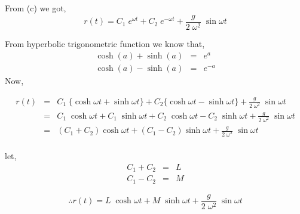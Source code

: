 \documentclass{article}
\begin{document}
\subsection{}%
\large{
    From (c) we got,
    $$r(t) = C_1\;e^{\omega t} + C_2\;e^{-\omega t} + \frac{g}{2\;\omega^2}\;\sin{\omega t}$$

    From hyperbolic trigonometric function we know that,
    \begin{eqnarray*}
        \cosh{(a)} + \sinh{(a)} &=& e^a\\
        \cosh{(a)} - \sinh{(a)} &=& e^{-a}
    \end{eqnarray*}
    Now,

    \begin{eqnarray*}
        r(t) &=& C_1\;\{\cosh{\omega t} + \sinh{\omega t}\} + C_2\{\cosh{\omega t} - \sinh{\omega t}\} + \frac{g}{2\;\omega^2}\;\sin{\omega t}\\
             &=& C_1\;\cosh{\omega t} + C_1\;\sinh{\omega t} + C_2\;\cosh{\omega t} - C_2\;\sinh{\omega t} + \frac{g}{2\;\omega^2}\;\sin{\omega t}\\
             &=& (C_1+C_2) \cosh{\omega t} + (C_1-C_2)\sinh{\omega t} + \frac{g}{2\;\omega^2}\;\sin{\omega t}\\
    \end{eqnarray*}

    let,
    \begin{eqnarray*}
        C_1 + C_2 &=& L\\
        C_1 - C_2 &=& M
    \end{eqnarray*}

    $$\therefore r(t) = L\;\cosh{\omega t} + M\;\sinh{\omega t} + \frac{g}{2\;\omega^2}\;\sin{\omega t}$$
}

\newpage
\end{document}
